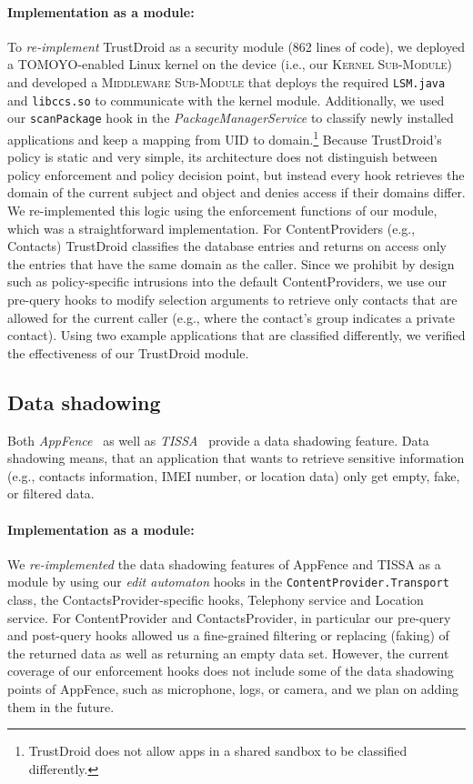 \documentclass[letterpaper,twocolumn,10pt]{article}
\newcommand{\KMODULE}{\textsc{Kernel Sub-Module}\xspace}
\newcommand{\MMODULE}{\textsc{Middleware Sub-Module}\xspace}
\begin{document}
\paragraph{Implementation as a module:} To \textit{re-implement} TrustDroid as a security module (862 lines of code), we deployed a TOMOYO-enabled Linux kernel on the device (i.e., our \KMODULE) and developed a \MMODULE that deploys the required \texttt{LSM.java} and \texttt{libccs.so} to communicate with the kernel module. Additionally, we used our \texttt{scanPackage} hook in the \textit{PackageManagerService} to classify newly installed applications and keep a mapping from UID to domain.\footnote{TrustDroid does not allow apps in a shared sandbox to be classified differently.} Because TrustDroid's policy is static and very simple, its architecture does not distinguish between policy enforcement and policy decision point, but instead every hook retrieves the domain of the current subject and object and denies access if their domains differ. We re-implemented this logic using the enforcement functions of our module, which was a straightforward implementation. For ContentProviders (e.g., Contacts) TrustDroid classifies the database entries and returns on access only the entries that have the same domain as the caller. Since we prohibit by design such as policy-specific intrusions into the default ContentProviders, we use our pre-query hooks to modify selection arguments to retrieve only contacts that are allowed for the current caller (e.g., where the contact's group indicates a private contact). Using two example applications that are classified differently, we verified the effectiveness of our TrustDroid module.

\subsection{Data shadowing~\cite{HoHaJuScWe_11:RetrofittingAndroid,tissa11}}

Both \textit{AppFence}~\cite{HoHaJuScWe_11:RetrofittingAndroid} as well as \textit{TISSA}~\cite{tissa11} provide a data shadowing feature. Data shadowing means, that an application that wants to retrieve sensitive information (e.g., contacts information, IMEI number, or location data) only get empty, fake, or filtered data.

\paragraph{Implementation as a module:} We \textit{re-implemented} the data shadowing features of AppFence and TISSA as a module by using our \textit{edit automaton} hooks in the \texttt{ContentProvider.Transport} class, the ContactsProvider-specific hooks, Telephony service and Location service. For ContentProvider and ContactsProvider, in particular our pre-query and post-query hooks allowed us a fine-grained filtering or replacing (faking) of the returned data as well as returning an empty data set. However, the current coverage of our enforcement hooks does not include some of the data shadowing points of AppFence, such as microphone, logs, or camera, and we plan on adding them in the future.
\end{document}
